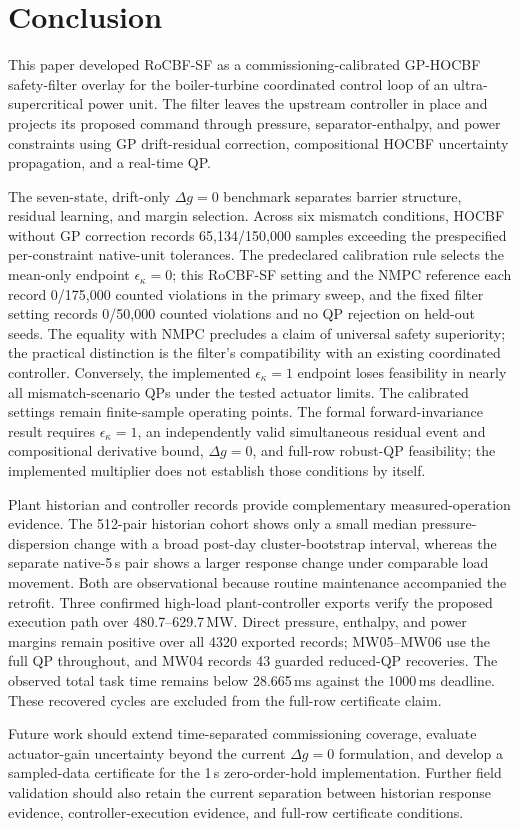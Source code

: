 \section{Conclusion}
\label{sec:conclusion}

This paper developed RoCBF-SF as a commissioning-calibrated GP-HOCBF safety-filter overlay for the boiler-turbine coordinated control loop of an ultra-supercritical power unit. The filter leaves the upstream controller in place and projects its proposed command through pressure, separator-enthalpy, and power constraints using GP drift-residual correction, compositional HOCBF uncertainty propagation, and a real-time QP.

The seven-state, drift-only $\Delta g=0$ benchmark separates barrier structure, residual learning, and margin selection. Across six mismatch conditions, HOCBF without GP correction records 65{,}134/150{,}000 samples exceeding the prespecified per-constraint native-unit tolerances. The predeclared calibration rule selects the mean-only endpoint $\epsilon_\kappa=0$; this RoCBF-SF setting and the NMPC reference each record 0/175{,}000 counted violations in the primary sweep, and the fixed filter setting records 0/50{,}000 counted violations and no QP rejection on held-out seeds. The equality with NMPC precludes a claim of universal safety superiority; the practical distinction is the filter's compatibility with an existing coordinated controller. Conversely, the implemented $\epsilon_\kappa=1$ endpoint loses feasibility in nearly all mismatch-scenario QPs under the tested actuator limits. The calibrated settings remain finite-sample operating points. The formal forward-invariance result requires $\epsilon_\kappa=1$, an independently valid simultaneous residual event and compositional derivative bound, $\Delta g=0$, and full-row robust-QP feasibility; the implemented multiplier does not establish those conditions by itself.

Plant historian and controller records provide complementary measured-operation evidence. The 512-pair historian cohort shows only a small median pressure-dispersion change with a broad post-day cluster-bootstrap interval, whereas the separate native-5\,s pair shows a larger response change under comparable load movement. Both are observational because routine maintenance accompanied the retrofit. Three confirmed high-load plant-controller exports verify the proposed execution path over 480.7--629.7\,MW. Direct pressure, enthalpy, and power margins remain positive over all 4320 exported records; MW05--MW06 use the full QP throughout, and MW04 records 43 guarded reduced-QP recoveries. The observed total task time remains below 28.665\,ms against the 1000\,ms deadline. These recovered cycles are excluded from the full-row certificate claim.

Future work should extend time-separated commissioning coverage, evaluate actuator-gain uncertainty beyond the current $\Delta g=0$ formulation, and develop a sampled-data certificate for the 1\,s zero-order-hold implementation. Further field validation should also retain the current separation between historian response evidence, controller-execution evidence, and full-row certificate conditions.
